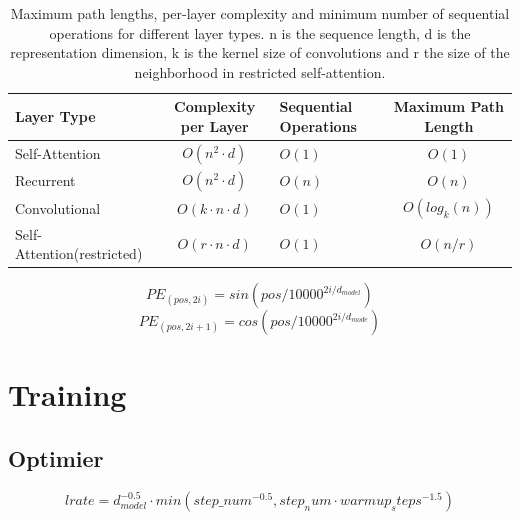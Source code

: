 \documentclass{article}
\begin{document}
\begin{table}[h]
    \centering
    \caption{Maximum path lengths, per-layer complexity and minimum number of sequential operations
    for different layer types. n is the sequence length, d is the representation dimension, k is the kernel
    size of convolutions and r the size of the neighborhood in restricted self-attention.}
    \label{tab1}
    \begin{tabular*}{\textwidth}{l c >{\centering}p{2cm} c} \\ \hline
        Layer Type & Complexity per Layer 
        & Sequential  Operations 
        & Maximum Path Length \\ \hline
        Self-Attention & $O(n^2 \cdot d)$
        & $O(1)$ & $O(1)$ \\
        Recurrent & $O(n^2 \cdot d)$
        & $O(n)$ & $O(n)$ \\
        Convolutional & $O(k \cdot n \cdot d)$
        & $O(1)$ & $O(log_k(n))$ \\
        Self-Attention(restricted) 
        & $O(r \cdot n \cdot d)$
        & $O(1)$ & $O(n/r)$ \\ \hline
    \end{tabular*}
    
\end{table}

\begin{equation*}
    PE_{(pos, 2i)} = sin(pos/10000^{2i/d_{model}}) \tag {haha}
\end{equation*}
\[
    PE_{(pos, 2i+1)} = cos(pos/10000^{2i/d_{mode}}) \tag{haha1}
\]

\section{Training}
\subsection{Optimier}
\begin{equation}
    lrate = d_{model}^{-0.5} \cdot min(step\_num^{-0.5}, step_num \cdot warmup_steps^{-1.5})
\end{equation}
\end{document}
